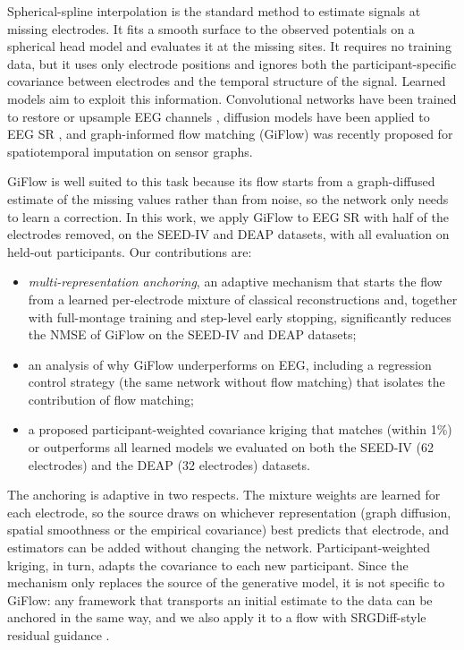 \documentclass{article}
\begin{document}
Spherical-spline interpolation \cite{perrin1989spherical} is the standard
method to estimate signals at missing electrodes. It fits a smooth surface
to the observed potentials on a spherical head model and evaluates it at
the missing sites. It requires no training data, but it uses only
electrode positions and ignores both the participant-specific covariance
between electrodes and the temporal structure of the signal. Learned
models aim to exploit this information. Convolutional networks have been
trained to restore or upsample EEG channels \cite{svantesson2021virtual},
diffusion models have been applied to EEG SR \cite{liu2026srgdiff}, and
graph-informed flow matching (GiFlow) \cite{zhang2026giflow} was recently
proposed for spatiotemporal imputation on sensor graphs.

GiFlow is well suited to this task because its flow
\cite{lipman2023flow} starts from a graph-diffused estimate of the missing
values rather than from noise, so the network only needs to learn a
correction. In this work, we apply GiFlow to EEG SR with half of the
electrodes removed, on the SEED-IV \cite{zheng2019emotionmeter} and DEAP
\cite{koelstra2012deap} datasets, with all evaluation on held-out
participants. Our contributions are:
\begin{itemize}
\setlength{\itemsep}{0pt}
\item \emph{multi-representation anchoring}, an adaptive mechanism that
starts the flow from a learned per-electrode mixture of classical
reconstructions and, together with full-montage training and step-level
early stopping, significantly reduces the NMSE of GiFlow on the SEED-IV
and DEAP datasets;
\item an analysis of why GiFlow underperforms on EEG, including a
regression control strategy (the same network without flow matching) that
isolates the contribution of flow matching;
\item a proposed participant-weighted covariance kriging that matches
(within 1\%) or outperforms all learned models we evaluated on both the SEED-IV (62 electrodes) and the DEAP
(32 electrodes) datasets.
\end{itemize}

The anchoring is adaptive in two respects. The mixture weights are learned
for each electrode, so the source draws on whichever representation (graph
diffusion, spatial smoothness or the empirical covariance) best predicts
that electrode, and estimators can be added without changing the network.
Participant-weighted kriging, in turn, adapts the covariance to each new
participant. Since the mechanism only replaces the source of the
generative model, it is not specific to GiFlow: any framework that
transports an initial estimate to the data can be anchored in the same
way, and we also apply it to a flow with SRGDiff-style residual guidance
\cite{liu2026srgdiff}.
\end{document}
